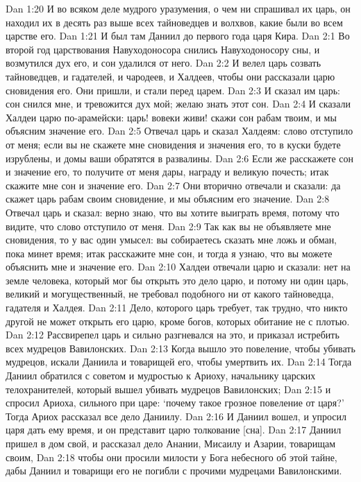 Dan 1:20  И во всяком деле мудрого уразумения, о чем ни спрашивал их царь, он находил их в десять раз выше всех тайноведцев и волхвов, какие были во всем царстве его.
Dan 1:21  И был там Даниил до первого года царя Кира.
Dan 2:1  Во второй год царствования Навуходоносора снились Навуходоносору сны, и возмутился дух его, и сон удалился от него.
Dan 2:2  И велел царь созвать тайноведцев, и гадателей, и чародеев, и Халдеев, чтобы они рассказали царю сновидения его. Они пришли, и стали перед царем.
Dan 2:3  И сказал им царь: сон снился мне, и тревожится дух мой; желаю знать этот сон.
Dan 2:4  И сказали Халдеи царю по-арамейски: царь! вовеки живи! скажи сон рабам твоим, и мы объясним значение его.
Dan 2:5  Отвечал царь и сказал Халдеям: слово отступило от меня; если вы не скажете мне сновидения и значения его, то в куски будете изрублены, и домы ваши обратятся в развалины.
Dan 2:6  Если же расскажете сон и значение его, то получите от меня дары, награду и великую почесть; итак скажите мне сон и значение его.
Dan 2:7  Они вторично отвечали и сказали: да скажет царь рабам своим сновидение, и мы объясним его значение.
Dan 2:8  Отвечал царь и сказал: верно знаю, что вы хотите выиграть время, потому что видите, что слово отступило от меня.
Dan 2:9  Так как вы не объявляете мне сновидения, то у вас один умысел: вы собираетесь сказать мне ложь и обман, пока минет время; итак расскажите мне сон, и тогда я узнаю, что вы можете объяснить мне и значение его.
Dan 2:10  Халдеи отвечали царю и сказали: нет на земле человека, который мог бы открыть это дело царю, и потому ни один царь, великий и могущественный, не требовал подобного ни от какого тайноведца, гадателя и Халдея.
Dan 2:11  Дело, которого царь требует, так трудно, что никто другой не может открыть его царю, кроме богов, которых обитание не с плотью.
Dan 2:12  Рассвирепел царь и сильно разгневался на это, и приказал истребить всех мудрецов Вавилонских.
Dan 2:13  Когда вышло это повеление, чтобы убивать мудрецов, искали Даниила и товарищей его, чтобы умертвить их.
Dan 2:14  Тогда Даниил обратился с советом и мудростью к Ариоху, начальнику царских телохранителей, который вышел убивать мудрецов Вавилонских;
Dan 2:15  и спросил Ариоха, сильного при царе: `почему такое грозное повеление от царя?' Тогда Ариох рассказал все дело Даниилу.
Dan 2:16  И Даниил вошел, и упросил царя дать ему время, и он представит царю толкование [сна].
Dan 2:17  Даниил пришел в дом свой, и рассказал дело Анании, Мисаилу и Азарии, товарищам своим,
Dan 2:18  чтобы они просили милости у Бога небесного об этой тайне, дабы Даниил и товарищи его не погибли с прочими мудрецами Вавилонскими.
